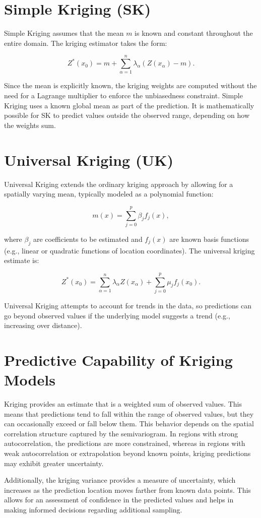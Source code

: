 \documentclass{article}
\begin{document}
\section{Simple Kriging (SK)}

Simple Kriging assumes that the mean \( m \) is known and constant throughout the entire domain. The kriging estimator takes the form:

\begin{equation}
    Z^*(x_0) = m + \sum_{\alpha=1}^{n} \lambda_{\alpha} (Z(x_{\alpha}) - m).
\end{equation}

Since the mean is explicitly known, the kriging weights are computed without the need for a Lagrange multiplier to enforce the unbiasedness constraint. Simple Kriging uses a known global mean as part of the prediction. It is mathematically possible for SK to predict values outside the observed range, depending on how the weights sum.

\section{Universal Kriging (UK)}

Universal Kriging extends the ordinary kriging approach by allowing for a spatially varying mean, typically modeled as a polynomial function:

\begin{equation}
    m(x) = \sum_{j=0}^{p} \beta_j f_j(x),
\end{equation}

where \( \beta_j \) are coefficients to be estimated and \( f_j(x) \) are known basis functions (e.g., linear or quadratic functions of location coordinates). The universal kriging estimate is:

\begin{equation}
    Z^*(x_0) = \sum_{\alpha=1}^{n} \lambda_{\alpha} Z(x_{\alpha}) + \sum_{j=0}^{p} \mu_j f_j(x_0).
\end{equation}

Universal Kriging attempts to account for trends in the data, so predictions can go beyond observed values if the underlying model suggests a trend (e.g., increasing over distance).

\section{Predictive Capability of Kriging Models}

Kriging provides an estimate that is a weighted sum of observed values. This means that predictions tend to fall within the range of observed values, but they can occasionally exceed or fall below them. This behavior depends on the spatial correlation structure captured by the semivariogram. In regions with strong autocorrelation, the predictions are more constrained, whereas in regions with weak autocorrelation or extrapolation beyond known points, kriging predictions may exhibit greater uncertainty.

Additionally, the kriging variance provides a measure of uncertainty, which increases as the prediction location moves farther from known data points. This allows for an assessment of confidence in the predicted values and helps in making informed decisions regarding additional sampling.
\end{document}
